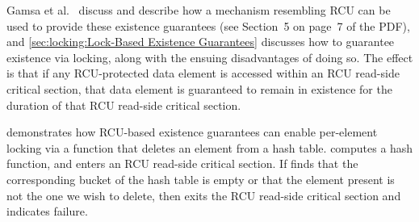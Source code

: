 Gamsa et al.~\cite{Gamsa99}
discuss  and describe how a mechanism
resembling RCU can be used to provide these existence guarantees
(see Section~5 on page~7 of the PDF), and
\cref{sec:locking:Lock-Based Existence Guarantees}
discusses how to guarantee existence via locking, along with the
ensuing disadvantages of doing so.
The effect is that if any RCU-protected data element is accessed
within an RCU read-side critical section, that data element is
guaranteed to remain in existence for the duration of that RCU
read-side critical section.

\begin{listing}
\begin{fcvlabel}
\end{fcvlabel}
\caption{Existence Guarantees Enable Per-Element Locking}
\label{lst:defer:Existence Guarantees Enable Per-Element Locking}
\end{listing}

\begin{fcvref}
demonstrates how RCU-based existence guarantees can enable
per-element locking via a function that deletes an element from
a hash table.
 computes a hash function, and  enters an RCU
read-side critical section.
If  finds that the corresponding bucket of the hash table is
empty or that the element present is not the one we wish to delete,
then  exits the RCU read-side critical section and
indicates failure.
\end{fcvref}

